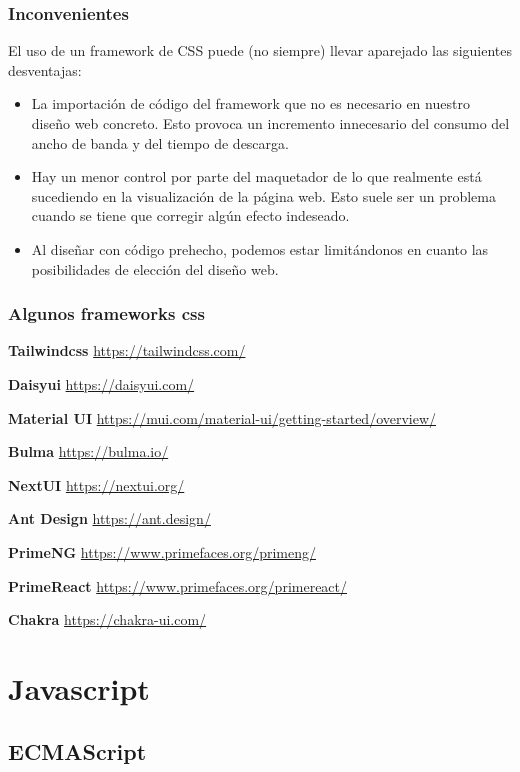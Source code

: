\begin{enumerate}
\subsubsection{Inconvenientes}
El uso de un framework de CSS puede (no siempre) llevar aparejado las siguientes desventajas:

\begin{itemize}
	\item La importación de código del framework que no es necesario en nuestro diseño web concreto. Esto provoca un incremento innecesario del consumo del ancho de banda y del tiempo de descarga.
	\item Hay un menor control por parte del maquetador de lo que realmente está sucediendo en la visualización de la página web. Esto suele ser un problema cuando se tiene que corregir algún efecto indeseado.
	\item Al diseñar con código prehecho, podemos estar limitándonos en cuanto las posibilidades de elección del diseño web.
\end{itemize}

\subsubsection{Algunos frameworks css}

\textbf{Tailwindcss}
\url{https://tailwindcss.com/}

\textbf{Daisyui}
\url{https://daisyui.com/}

\textbf{Material UI}
\url{https://mui.com/material-ui/getting-started/overview/}

\textbf{Bulma}
\url{https://bulma.io/}

\textbf{NextUI}
\url{https://nextui.org/}

\textbf{Ant Design}
\url{https://ant.design/}

\textbf{PrimeNG}
\url{https://www.primefaces.org/primeng/}

\textbf{PrimeReact}
\url{https://www.primefaces.org/primereact/}

\textbf{Chakra}
\url{https://chakra-ui.com/}

\section{Javascript}

\subsection{ECMAScript}


\end{enumerate}
